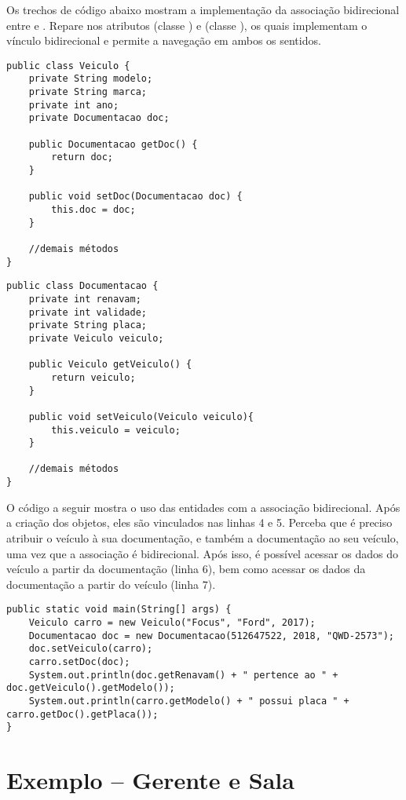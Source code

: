 Os trechos de código abaixo mostram a implementação da associação bidirecional entre  e . Repare nos atributos  (classe ) e  (classe ), os quais implementam o vínculo bidirecional e permite a navegação em ambos os sentidos.

 \begin{verbatim}
public class Veiculo {
	private String modelo;
	private String marca;
	private int ano;
	private Documentacao doc;
	
	public Documentacao getDoc() {
		return doc;
	}
	
	public void setDoc(Documentacao doc) {
		this.doc = doc;
	}
	
	//demais métodos
}
\end{verbatim}

\begin{verbatim}
public class Documentacao {
	private int renavam;
	private int validade;
	private String placa;
	private Veiculo veiculo;
	
	public Veiculo getVeiculo() {
		return veiculo;
	}
	
	public void setVeiculo(Veiculo veiculo){
		this.veiculo = veiculo;
	}
	
	//demais métodos
}
\end{verbatim}

O código a seguir mostra o uso das entidades com a associação bidirecional. Após a criação dos objetos, eles são vinculados nas linhas 4 e 5. Perceba que é preciso atribuir o veículo à sua documentação, e também a documentação ao seu veículo, uma vez que a associação é bidirecional. Após isso, é possível acessar os dados do veículo a partir da documentação (linha 6), bem como acessar os dados da documentação a partir do veículo (linha 7).

\begin{verbatim}
public static void main(String[] args) {
	Veiculo carro = new Veiculo("Focus", "Ford", 2017);
	Documentacao doc = new Documentacao(512647522, 2018, "QWD-2573");
	doc.setVeiculo(carro);
	carro.setDoc(doc);
	System.out.println(doc.getRenavam() + " pertence ao " + doc.getVeiculo().getModelo());
	System.out.println(carro.getModelo() + " possui placa " + carro.getDoc().getPlaca());
}
\end{verbatim}

 
\section{Exemplo -- Gerente e Sala}
 
